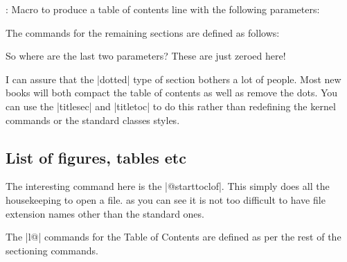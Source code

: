 \begin{teX}
: Macro
to produce a table of contents line with the following parameters:
\end{teX}

The commands for the remaining sections are defined as follows:

\begin{teX}
\newcommand*\l@section{\@dottedtocline{1}{1.5em}{2.3em}}
\newcommand*\l@subsection{\@dottedtocline{2}{3.8em}{3.2em}}
\newcommand*\l@subsubsection{\@dottedtocline{3}{7.0em}{4.1em}}
\newcommand*\l@paragraph{\@dottedtocline{4}{10em}{5em}}
\newcommand*\l@subparagraph{\@dottedtocline{5}{12em}{6em}}
\end{teX}

So where are the last two parameters? These are just zeroed here!


I can assure that the |dotted| type of section bothers a lot of people. Most new books will both compact the table of contents as well as remove the dots. You can use the |titlesec| and |titletoc| to do this rather than redefining the kernel commands or the standard classes styles.

\subsection{List of figures, tables etc}
\begin{teX}
\newcommand\listoffigures{%
    \if@twocolumn
      \@restonecoltrue\onecolumn
    \else
      \@restonecolfalse
    \fi
    \chapter*{\listfigurename}%
      \@mkboth{\MakeUppercase\listfigurename}%
              {\MakeUppercase\listfigurename}%
    \@starttoc{lof}%
    \if@restonecol\twocolumn\fi
    }
\end{teX}
The interesting command here is the |@starttoc{lof}|. This simply does all the housekeeping to open a file. as you can see it is not too difficult to have file extension names other than the standard ones.

The |l@| commands for the Table of Contents are defined as per the rest of the sectioning commands.

\begin{teX}
\newcommand*\l@figure{\@dottedtocline{1}{1.5em}{2.3em}}
\newcommand\listoftables{%
    \if@twocolumn
      \@restonecoltrue\onecolumn
    \else
      \@restonecolfalse
    \fi
    \chapter*{\listtablename}%
      \@mkboth{%
          \MakeUppercase\listtablename}%
         {\MakeUppercase\listtablename}%
    \@starttoc{lot}%
    \if@restonecol\twocolumn\fi
    }
\let\l@table\l@figure
\end{teX}

